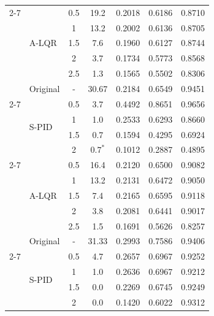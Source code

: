 \documentclass{article}
\theoremstyle{plain}
\theoremstyle{definition}
\theoremstyle{remark}
\begin{document}
\begin{table}[t]
{\begin{threeparttable}
\begin{tabular}{llc|c|ccc}
    \cmidrule(lr){2-7}
& \multirow{5}{*}{A-LQR} & 0.5 & 19.2 & 0.2018 & 0.6186 & 0.8710 \\
& & 1 & 13.2 & 0.2002 & 0.6136 & 0.8705 \\
& & 1.5 & 7.6 & 0.1960 & 0.6127 & 0.8744 \\
& & 2 & 3.7 & 0.1734 & 0.5773 & 0.8568 \\
& & 2.5 & 1.3 & 0.1565 & 0.5502 & 0.8306 \\




    \midrule
    & Original & - & 30.67 & 0.2184 & 0.6549 & 0.9451 \\
    
    \cmidrule(lr){2-7}
    \multirow{9}{*}{\rotatebox{90}{Gemma-2-9B}} 
& \multirow{4}{*}{S-PID} & 0.5 & 3.7 & 0.4492 & 0.8651 & 0.9656 \\
& & 1 & 1.0 & 0.2533 & 0.6293 & 0.8660 \\
& & 1.5 & 0.7 & 0.1594 & 0.4295 & 0.6924 \\
& & 2 & $0.7^*$ & 0.1012 & 0.2887 & 0.4895 \\
        
    \cmidrule(lr){2-7}
& \multirow{5}{*}{A-LQR} & 0.5 & 16.4 & 0.2120 & 0.6500 & 0.9082 \\
& & 1 & 13.2 & 0.2131 & 0.6472 & 0.9050 \\
& & 1.5 & 7.4 & 0.2165 & 0.6595 & 0.9118 \\
& & 2 & 3.8 & 0.2081 & 0.6441 & 0.9017 \\
& & 2.5 & 1.5 & 0.1691 & 0.5626 & 0.8257 \\
    
    

    \midrule
    & Original & - & 31.33 & 0.2993 & 0.7586 & 0.9406 \\
    
    \cmidrule(lr){2-7}
    \multirow{9}{*}{\rotatebox{90}{Qwen-2.5-14B}} 
& \multirow{4}{*}{S-PID} & 0.5 & 4.7 & 0.2657 & 0.6967 & 0.9252 \\
& & 1 & 1.0 & 0.2636 & 0.6967 & 0.9212 \\
& & 1.5 & 0.0 & 0.2269 & 0.6745 & 0.9249 \\
& & 2 & 0.0 & 0.1420 & 0.6022 & 0.9312 \\
        

\end{tabular}
\end{threeparttable}}
\end{table}
\end{document}
